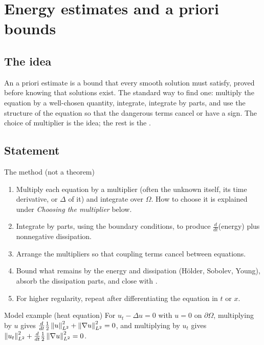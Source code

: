 
\section{Energy estimates and a priori bounds}\label{p:energy-estimates}


\subsection*{The idea}

An a priori estimate is a bound that every smooth solution must satisfy, proved before knowing that solutions exist. The standard way to find one: multiply the equation by a well-chosen quantity, integrate, integrate by parts, and use the structure of the equation so that the dangerous terms cancel or have a sign. The choice of multiplier is the idea; the rest is the .

\subsection*{Statement}

\begin{thmbox}{The method (not a theorem)}
%
\begin{enumerate}
\item Multiply each equation by a multiplier (often the unknown itself, its time derivative, or $\Delta$ of it) and integrate over $\Omega$. How to choose it is explained under \emph{Choosing the multiplier} below.
\item Integrate by parts, using the boundary conditions, to produce $\frac{d}{dt}$(energy) plus nonnegative dissipation.
\item Arrange the multipliers so that coupling terms cancel between equations.
\item Bound what remains by the energy and dissipation (Hölder, Sobolev, Young), absorb the dissipation parts, and close with .
\item For higher regularity, repeat after differentiating the equation in $t$ or $x$.
\end{enumerate}
\end{thmbox}

\begin{exbox}{Model example (heat equation)}
For $u_t-\Delta u=0$ with $u=0$ on $\partial\Omega$, multiplying by $u$ gives $\frac{d}{dt}\frac12\left\lVert u\right\rVert_{L^2}^2+\left\lVert \nabla u\right\rVert_{L^2}^2=0$, and multiplying by $u_t$ gives $\left\lVert u_t\right\rVert_{L^2}^2+\frac{d}{dt}\frac12\left\lVert \nabla u\right\rVert_{L^2}^2=0$.
\end{exbox}

